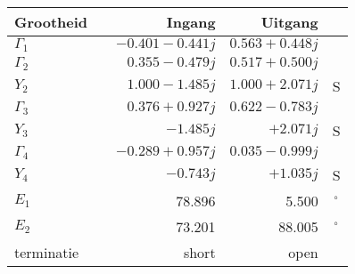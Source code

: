 \begin{tabular}{|lc|r|r|c|} 
\hline \textbf{Grootheid} & & \textbf{Ingang} & \textbf{Uitgang} & \\ 
\hline $\Gamma_1$ &  & $-0.401 -0.441 j$ & $0.563 +0.448 j$ &  \\ 
\hline $\Gamma_2$ &  & $0.355 -0.479 j$ & $0.517 +0.500 j$ &  \\ 
\hline $Y_2$ &  & $1.000 -1.485 j$ & $1.000 +2.071 j$ & S \\ 
\hline $\Gamma_3$ &  & $0.376 +0.927 j$ & $0.622 -0.783 j$ &  \\ 
\hline $Y_3$ &  & $-1.485 j$ & $+2.071 j$ & S \\ 
\hline $\Gamma_4$ &  & $-0.289 +0.957 j$ & $0.035 -0.999 j$ &  \\ 
\hline $Y_4$ &  & $-0.743 j$ & $+1.035 j$ & S \\ 
\hline $E_1$ &  & 78.896 & 5.500 & $^{\circ}$ \\ 
\hline $E_2$ &  & 73.201 & 88.005 & $^{\circ}$ \\ 
\hline terminatie &  & short & open &  \\ 
\hline \end{tabular} 

